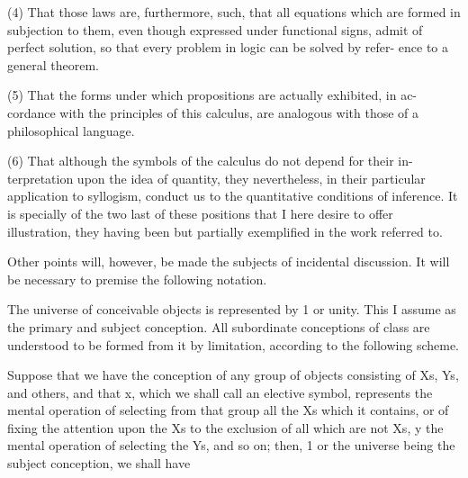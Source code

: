 \documentclass{article}
\begin{document}
{\hspace{.2in}


    (4) That those laws are, furthermore, such, that all equations which are
formed in subjection to them, even though expressed under functional signs,
admit of perfect solution, so that every problem in logic can be solved by refer-
ence to a general theorem.\vspace{.05in}

\hspace{.2in}


    (5) That the forms under which propositions are actually exhibited, in ac-
cordance with the principles of this calculus, are analogous with those of a
philosophical language.\vspace{.05in}

\hspace{.2in}


    (6) That although the symbols of the calculus do not depend for their in-
terpretation upon the idea of quantity, they nevertheless, in their particular
application to syllogism, conduct us to the quantitative conditions of inference.
    It is specially of the two last of these positions that I here desire to offer
illustration, they having been but partially exemplified in the work referred to.\vspace{.05in}

 Other points will, however, be made the subjects of incidental discussion. It
will be necessary to premise the following notation.\vspace{.05in}

\hspace{.2in}

    The universe of conceivable objects is represented by 1 or unity. This I
assume as the primary and subject conception. All subordinate conceptions
of class are understood to be formed from it by limitation, according to the
following scheme.\vspace{.05in}

\hspace{.2in}

     Suppose that we have the conception of any group of objects consisting of
Xs, Ys, and others, and that x, which we shall call an elective symbol, represents
the mental operation of selecting from that group all the Xs which it contains,
or of fixing the attention upon the Xs to the exclusion of all which are not Xs,
y the mental operation of selecting the Ys, and so on; then, 1 or the universe
being the subject conception, we shall have\vspace{.1in}

}
\end{document}
